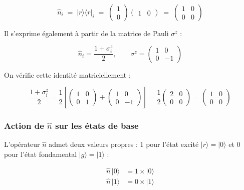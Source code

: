 \documentclass{ceri/sty/rapport}
\begin{document}
\begin{equation}
\hat{n}_i \;=\; |r\rangle\langle r|_i
\;=\; \begin{pmatrix} 1 \\ 0 \end{pmatrix}\begin{pmatrix} 1 & 0 \end{pmatrix}
\;=\; \begin{pmatrix} 1 & 0 \\ 0 & 0 \end{pmatrix}
\end{equation}

Il s'exprime également à partir de la matrice de Pauli $\sigma^z$ :

\begin{equation}
\hat{n}_i = \frac{1+\sigma_i^z}{2}, \qquad
\sigma^z = \begin{pmatrix} 1 & 0 \\ 0 & -1\end{pmatrix}
\end{equation}

On vérifie cette identité matriciellement :

\begin{equation}
\frac{1+\sigma_i^z}{2} = \frac{1}{2}\left[
\begin{pmatrix}1&0\\0&1\end{pmatrix} + \begin{pmatrix}1&0\\0&-1\end{pmatrix}
\right]
= \frac{1}{2}\begin{pmatrix}2 & 0\\0&0\end{pmatrix}
= \begin{pmatrix}1&0\\0&0\end{pmatrix}
\end{equation}

\subsubsection*{Action de $\hat{n}$ sur les états de base}

L'opérateur $\hat{n}$ admet deux valeurs propres : $1$ pour l'état excité $|r\rangle = |0\rangle$
et $0$ pour l'état fondamental $|g\rangle = |1\rangle$ :

\begin{align}
\hat{n}\,|0\rangle &= 1\times|0\rangle \\
\hat{n}\,|1\rangle &= 0\times|1\rangle
\end{align}
\end{document}
